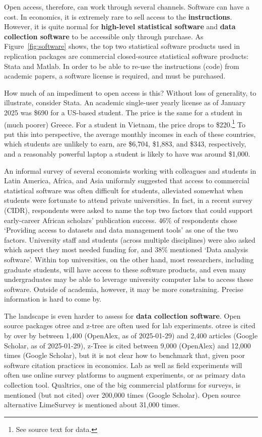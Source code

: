 \documentclass{article}
\begin{document}
{Open access, therefore, can work through several channels. Software can have a cost. In economics, it is extremely rare to sell access to the \textbf{instructions}. However, it is quite normal for \textbf{high-level statistical software} and \textbf{data collection software} to be accessible only through purchase. As Figure~\ref{fig:software} shows, the top two statistical software products used in replication packages are commercial closed-source statistical software products: Stata and Matlab. In order to be able to re-use the instructions (code) from academic papers, a software license is required, and must be purchased. 

How much of an impediment to open access is this? Without loss of generality, to illustrate, consider Stata. An academic single-user yearly license as of January 2025 was \$690 for a US-based student. The price is the same for a student in (much poorer) Greece. For a student in Vietnam, the price drops to \$220.\footnote{See source text for data.}  To put this into perspective, the average monthly incomes in each of these countries, which students are unlikely to earn, are \$6,704, \$1,883, and \$343, respectively, and a reasonably powerful laptop a student is likely to have was around \$1,000. 




An informal survey of several economists working with colleagues and students in Latin America, Africa, and Asia uniformly suggested that access to commercial statistical software was often difficult for students, alleviated somewhat when students were fortunate to attend private universities. In fact, in a recent survey (CIDR), respondents were asked to name the top two factors that could support early-career African scholars’ publication success. 46\% of respondents chose 
`Providing access to datasets and data management tools' as one of the two factors. University staff and students (across multiple disciplines) were also asked which aspect they  most needed funding for, and 38\% mentioned `Data analysis software'. Within top universities, on the other hand, most researchers, including graduate students, will have access to these software products, and even many undergraduates may be able to leverage university computer labs to access these software. Outside of academia, however, it may be more constraining. Precise information is hard to come by.

The landscape is even harder to assess for \textbf{data collection software}. Open source packages otree and z-tree are often used for lab experiments. otree is cited by over by between 1,400 (OpenAlex, as of 2025-01-29) and 2,400 articles (Google Scholar, as of 2025-01-29), z-Tree is cited between 9,000 (OpenAlex) and 12,000 times (Google Scholar), but it is not clear how to benchmark that, given poor software citation practices in economics. Lab as well as field experiments will often use online survey platforms to augment experiments, or as primary data collection tool. Qualtrics, one of the big commercial platforms for surveys, is mentioned (but not cited) over 200,000 times (Google Scholar). Open source alternative LimeSurvey is mentioned about 31,000 times.

}
\end{document}
